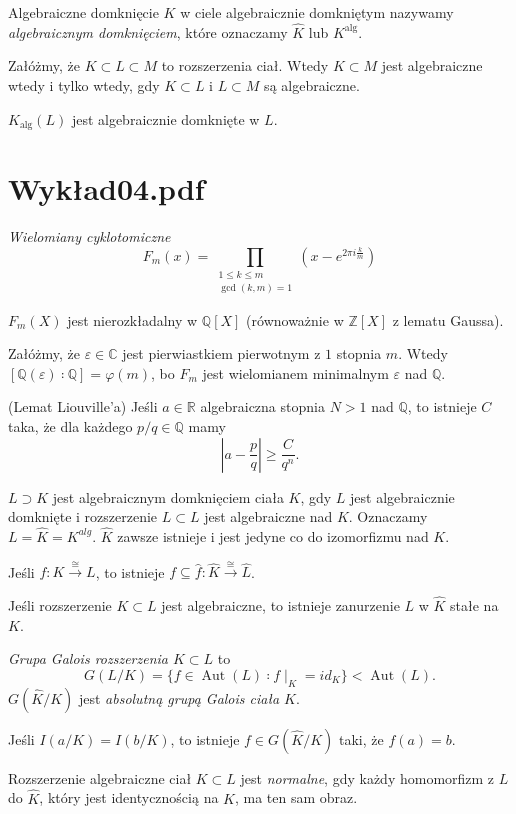 \documentclass[a4paper, 12pt]{article}
\DeclareMathOperator{\alg}{alg}
\DeclareMathOperator{\Aut}{Aut}
\newcommand{\modulus}[1]{\left| #1 \right|}
\newcommand{\abs}{\modulus}
\newcommand{\+}{\enspace}
\begin{document}
Algebraiczne domknięcie $K$ w ciele algebraicznie domkniętym
nazywamy \textit{algebraicznym domknięciem},
które oznaczamy $\hat{K}$ lub $K^{\alg}$.


Załóżmy, że $K⊂L⊂M$ to rozszerzenia ciał.
Wtedy $K⊂M$ jest algebraiczne wtedy i tylko wtedy, gdy
$K⊂L$ i $L⊂M$ są algebraiczne.

$K_{\alg}(L)$ jest algebraicznie domknięte w $L$.

\section*{Wykład04.pdf}
\textit{Wielomiany cyklotomiczne}
$$ F_m(x) =
	∏_{\substack{1≤k≤m \\ \gcd(k,m) = 1}}
		\left(x-e^{2πi\frac{k}{m}}\right)
$$

$F_m(X)$ jest nierozkładalny w $ℚ[X]$ (równoważnie w $ℤ[X]$ z lematu Gaussa).

Załóżmy, że $ε∈ℂ$ jest pierwiastkiem pierwotnym z $1$ stopnia $m$.
Wtedy $[ℚ(ε)∶ℚ] = φ(m)$, bo $F_m$ jest wielomianem minimalnym $ε$ nad $ℚ$.

(Lemat Liouville'a)
Jeśli $a∈ℝ$ algebraiczna stopnia $N>1$ nad $ℚ$, to
istnieje $C$ taka, że dla każdego $p/q∈ℚ$ mamy
$$\abs{a-\frac{p}{q}} ≥ \frac{C}{q^n}.$$

$L ⊃ K$ jest algebraicznym domknięciem ciała $K$, gdy
$L$ jest algebraicznie domknięte i
rozszerzenie $L ⊂ L$ jest algebraiczne nad $K$.
Oznaczamy $L=\hat{K}=K^{alg}$.
$\hat{K}$ zawsze istnieje
i jest jedyne co do izomorfizmu nad $K$.

Jeśli $f: K \stackrel{≅}{→} L$,
to istnieje $f⊆\hat{f}: \hat{K} \stackrel{≅}{→} \hat{L}$.

Jeśli rozszerzenie $K ⊂ L$ jest algebraiczne, to istnieje zanurzenie
$L$ w $\hat{K}$ stałe na $K$.

\textit{Grupa Galois rozszerzenia $K ⊂ L$} to
$$G(L/K) = \{ f∈\Aut(L) ∶ f\mid_K=id_K \} < \Aut(L).$$
$G(\hat{K}/K)$ jest \textit{absolutną grupą Galois ciała $K$}.

Jeśli $I(a/K) = I(b/K)$, to istnieje $f∈G(\hat{K}/K)$ taki,
że $f(a) = b$.

Rozszerzenie algebraiczne ciał $K ⊂ L$ jest \textit{normalne},
gdy każdy homomorfizm z $L$ do $\hat{K}$,
który jest identycznością na $K$, ma ten sam obraz. %
\end{document}
